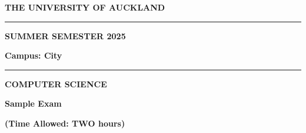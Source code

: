 \documentclass[addpoints,12pt]{exam}
\begin{document}
\begin{center}
    \vspace*{1cm}
    
    \textbf{\fontsize{20}{8}\selectfont THE UNIVERSITY OF AUCKLAND}
    
    \vspace{0.4cm}
    
    \noindent\rule{0.6\linewidth}{0.4pt}
    
    \vspace{0.5cm}
    
    \textbf{\fontsize{12}{8}\selectfont  SUMMER SEMESTER 2025}
    
    \vspace{0.2cm}
    
    \textbf{\fontsize{12}{8}\selectfont  Campus: City}
    
    \noindent\rule{0.6\linewidth}{0.4pt}
            
    \vspace{0.8cm}
    
    \textbf{\fontsize{12}{8}\selectfont COMPUTER SCIENCE}
    
    \vspace{0.8cm}
    
    \textbf{\fontsize{12}{8}\selectfont  Sample Exam}
    
    \vspace{0.8cm}
    
    \textbf{\fontsize{12}{8}\selectfont  (Time Allowed: TWO hours) }
\end{center}

\vspace{0.8cm}
\end{document}
